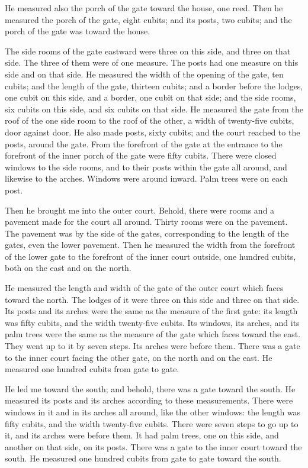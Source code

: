 \myverse{}He measured also the porch of the gate toward the house, one reed.
\myverse{}Then he measured the porch of the gate, eight cubits; and its posts, two cubits;
and the porch of the gate was toward the house.

\myverse{}The side rooms of the gate eastward were three on this side,
and three on that side. The three of them were of one measure. The posts had one measure on this side
and on that side.
\myverse{}He measured the width of the opening of the gate, ten cubits; and the length
of the gate, thirteen cubits;
\myverse{}and a border before the lodges, one cubit on this side, and a border, one
cubit on that side; and the side rooms, six cubits on this side, and six cubits on that side.
\myverse{}He measured the gate from the roof of the one side room to the roof of the
other, a width of twenty-five cubits, door against door.
\myverse{}He also made posts, sixty cubits; and the court reached to the posts, around
the gate.
\myverse{}From the forefront of the gate at the entrance to the forefront of the inner
porch of the gate were fifty cubits.
\myverse{}There were closed windows to the side rooms, and to their posts within the
gate all around, and likewise to the arches. Windows were around inward. Palm trees were on each post.

\myverse{}Then he brought me into the outer court. Behold, there were
rooms and a pavement made for the court all around. Thirty rooms were on the pavement.
\myverse{}The pavement was by the side of the gates, corresponding to the length of
the gates, even the lower pavement.
\myverse{}Then he measured the width from the forefront of the lower gate to the forefront
of the inner court outside, one hundred cubits, both on the east and on the north.

\myverse{}He measured the length and width of the gate of the outer court
which faces toward the north.
\myverse{}The lodges of it were three on this side and three on that side. Its posts
and its arches were the same as the measure of the first gate: its length was fifty cubits, and the width
twenty-five cubits.
\myverse{}Its windows, its arches, and its palm trees were the same as the measure
of the gate which faces toward the east. They went up to it by seven steps. Its arches were before them.
\myverse{}There was a gate to the inner court facing the other gate, on the north and
on the east. He measured one hundred cubits from gate to gate.

\myverse{}He led me toward the south; and behold, there was a gate toward
the south. He measured its posts and its arches according to these measurements.
\myverse{}There were windows in it and in its arches all around, like the other windows:
the length was fifty cubits, and the width twenty-five cubits.
\myverse{}There were seven steps to go up to it, and its arches were before them. It
had palm trees, one on this side, and another on that side, on its posts.
\myverse{}There was a gate to the inner court toward the south. He measured one hundred
cubits from gate to gate toward the south.


